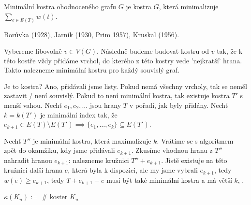 \documentclass[12pt]{article}					%
\begin{document}
    \begin{definice}
        Minimální kostra ohodnoceného grafu $G$ je kostra $G$, která minimalizuje $\sum_{e \in E(T)} w(t)$.
    \end{definice}

    \begin{poznamka}
        Borůvka (1928), Jarník (1930, Prim 1957), Kruskal (1956).
    \end{poznamka}

    \begin{definice}
        Vybereme libovolně $v\in V(G)$. Následně budeme budovat kostru od $v$ tak, že k této kostře vždy přidáme vrchol, do kterého z této kostry vede 'nejkratší' hrana. Takto nalezneme minimální kostru pro každý souvislý graf.

        \begin{dukazin}
            Je to kostra? Ano, přidávali jsme listy. Pokud nemá všechny vrcholy, tak se neměl zastavit / není souvislý. Pokud to není minimální kostra, tak existuje kostra $T'$ s menší vahou. Nechť $e_1, e_2, …$ jsou hrany $T$ v pořadí, jak byly přidány. Nechť $k = k(T')$ je minimální index tak, že $e_{k+1} \in E(T) \setminus E(T') \implies \{e_1, …, e_k\} \subseteq E(T')$.

            Nechť $T''$ je minimální kostra, která maximalizuje $k$. Vrátíme se s algoritmem zpět do okamžiku, kdy jsme přidávali $e_{k+1}$. Zkusíme vhodnou hranu z $T''$ nahradit hranou $e_{k+1}$: nalezneme kružnici $T'' + e_{k+1}$. Jistě existuje na této kružnici další hrana $e$, která byla k dispozici, ale my jsme vybrali $e_{k+1}$, tedy $w(e) ≥ e_{k+1}$, tedy $T + e_{k+1} - e$ musí být také minimální kostra a má větší $k$, \lightning.
        \end{dukazin}
    \end{definice}

    \begin{definice}
        $\kappa(K_n) := $ \# koster $K_n$
    \end{definice}
    
\end{document}
